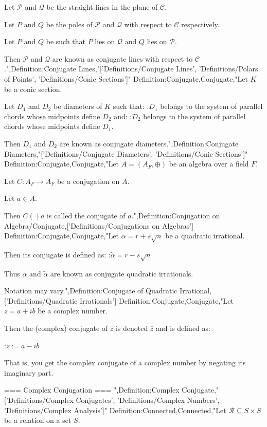 Let $\mathcal P$ and $\mathcal Q$ be the straight lines in the plane of $\mathcal C$.


Let $P$ and $Q$ be the poles of $\mathcal P$ and $\mathcal Q$ with respect to $\mathcal C$ respectively.

Let $P$ and $Q$ be such that $P$ lies on $\mathcal Q$ and $Q$ lies on $\mathcal P$.

Then $\mathcal P$ and $\mathcal Q$ are known as conjugate lines with respect to $\mathcal C$.",Definition:Conjugate Lines,"['Definitions/Conjugate Lines', 'Definitions/Polars of Points', 'Definitions/Conic Sections']"
Definition:Conjugate,Conjugate,"Let $K$ be a conic section.

Let $D_1$ and $D_2$ be diameters of $K$ such that:
:$D_1$ belongs to the system of parallel chords whose midpoints define $D_2$
and:
:$D_2$ belongs to the system of parallel chords whose midpoints define $D_1$.

Then $D_1$ and $D_2$ are known as conjugate diameters.",Definition:Conjugate Diameters,"['Definitions/Conjugate Diameters', 'Definitions/Conic Sections']"
Definition:Conjugate,Conjugate,"Let $A = \left( A_F, \oplus \right)$ be an algebra over a field $F$.

Let $C: A_F \to A_F$ be a conjugation on $A$.

Let $a \in A$.


Then $C \left(   \right)a$ is called the conjugate of $a$.",Definition:Conjugation on Algebra/Conjugate,['Definitions/Conjugations on Algebras']
Definition:Conjugate,Conjugate,"Let $\alpha = r + s \sqrt n$ be a quadratic irrational.


Then its conjugate is defined as:
:$\tilde \alpha = r - s \sqrt n$


Thus $\alpha$ and $\tilde \alpha$ are known as conjugate quadratic irrationals.


Notation may vary.",Definition:Conjugate of Quadratic Irrational,['Definitions/Quadratic Irrationals']
Definition:Conjugate,Conjugate,"Let $z = a + i b$ be a complex number.


Then the (complex) conjugate of $z$ is denoted $\overline z$ and is defined as:

:$\overline z := a - i b$


That is, you get the complex conjugate of a complex number by negating its imaginary part.


=== Complex Conjugation ===
",Definition:Complex Conjugate,"['Definitions/Complex Conjugates', 'Definitions/Complex Numbers', 'Definitions/Complex Analysis']"
Definition:Connected,Connected,"Let $\mathcal R \subseteq S \times S$ be a relation on a set $S$.


